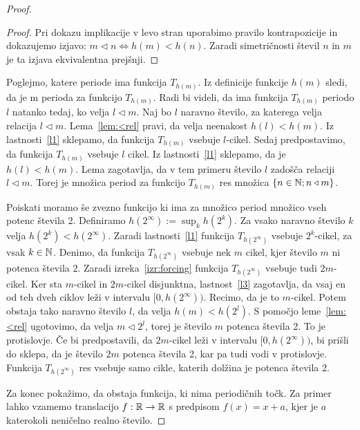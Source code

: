 \documentclass[../TG_magistrsko_delo_sections.tex]{subfiles}
\begin{document}
\begin{proof}
\begin{proof}
Pri dokazu implikacije v levo stran uporabimo pravilo kontrapozicije in dokazujemo izjavo: $ m \triangleleft n \iff h(m) < h(n)$. Zaradi simetričnosti števil $n$ in $m$ je ta izjava ekvivalentna prejšnji.
\end{proof}
Poglejmo, katere periode ima funkcija $T_{h(m)}$. Iz definicije funkcije $h(m)$ sledi, da je m perioda za funkcijo $T_{h(m)}$. Radi bi videli, da ima funkcija $T_{h(m)}$ periodo $l$ natanko tedaj, ko velja $l \triangleleft m$. Naj bo $l$ naravno število, za katerega velja relacija $l \triangleleft m$. Lema~\ref{lem:<rel} pravi, da velja neenakost $h(l) < h(m)$. Iz lastnosti~\ref{l1} sklepamo, da funkcija $T_{h(m)}$ vsebuje $l$-cikel. Sedaj predpostavimo, da funkcija $T_{h(m)}$ vsebuje $l$ cikel. Iz lastnosti~\ref{l1} sklepamo, da je $h(l) < h(m)$. Lema zagotavlja, da v tem primeru število $l$ zadošča relaciji $l \triangleleft m$. Torej je množica period za funkcijo $T_{h(m)}$ res množica $\{n \in \mathbb N; n \triangleleft m\}$.

Poiskati moramo še zvezno funkcijo ki ima za množico period množico vseh potenc števila 2. Definiramo $h(2^{\infty}) := \sup_k h(2^k)$. Za vsako naravno število $k$ velja $h(2^k) < h(2^{\infty})$. Zaradi lastnosti~\ref{l1} funkcija $T_{h(2^{\infty})}$ vsebuje $2^k$-cikel, za vsak $k \in \mathbb N$. 
Denimo, da funkcija $T_{h(2^{\infty})}$ vsebuje nek $m$ cikel, kjer število $m$ ni potenca števila 2. Zaradi izreka~\ref{izr:forcing} funkcija $T_{h(2^{\infty})}$ vsebuje tudi $2m$-cikel. Ker sta $m$-cikel in $2m$-cikel disjunktna, lastnost~\ref{l3} zagotavlja, da vsaj en od teh dveh ciklov leži v intervalu $[0, h(2^{\infty}))$. Recimo, da je to $m$-cikel. Potem obstaja tako naravno število $l$, da velja $h(m) < h(2^l)$. S pomočjo leme~\ref{lem:<rel} ugotovimo, da velja $m \triangleleft 2^l$, torej je število $m$ potenca števila 2. To je protislovje. Če bi predpostavili, da $2m$-cikel leži v intervalu $[0, h(2^{\infty}))$, bi prišli do sklepa, da je število $2m$ potenca števila 2, kar pa tudi vodi v protislovje. Funkcija $T_{h(2^{\infty})}$ res vsebuje samo cikle, katerih dolžina je potenca števila 2.

Za konec pokažimo, da obstaja funkcija, ki nima periodičnih točk. Za primer lahko vzamemo translacijo $f : \mathbb R \to \mathbb R$ s predpisom $f(x) = x + a$, kjer je $a$ katerokoli neničelno realno število.
\end{proof}
\end{document}
